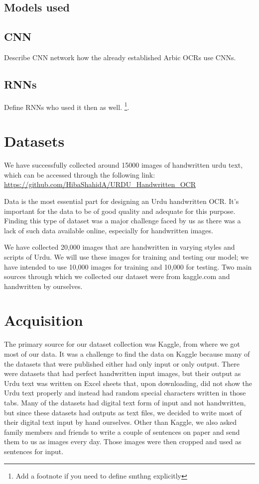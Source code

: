 \documentclass[9pt,twocolumn,twoside]{article} %
\begin{document}
\subsection{Models used}


\subsection{CNN}
Describe CNN network how the already established Arbic OCRs use CNNs.

\cite{rizvi2018ocr} %
\cite{mahdi2024ocr} %

\subsection{RNNs}
Define RNNs who used it \cite{rizvi2018ocr} then as well.
\footnote{ Add a footnote if you need to define smthng explicitly}.


\section{Datasets}
We have successfully collected around 15000 images of handwritten urdu text, which can be accessed through the following link:\\
\url{https://github.com/HibaShahidA/URDU_Handwritten_OCR}

Data is the most essential part for designing an Urdu handwritten OCR. It's important for the data to be of good quality and adequate for this purpose. Finding this type of dataset was a major challenge faced by us as there was a lack of such data available online, especially for handwritten images.

We have collected 20,000 images that are handwritten in varying styles and scripts of Urdu. We will use these images for training and testing our model; we have intended to use 10,000 images for training and 10,000 for testing. Two main sources through which we collected our dataset were from kaggle.com and handwritten by ourselves.

\section*{Acquisition}
The primary source for our dataset collection was Kaggle, from where we got most of our data. It was a challenge to find the data on Kaggle because many of the datasets that were published either had only input or only output. There were datasets that had perfect handwritten input images, but their output as Urdu text was written on Excel sheets that, upon downloading, did not show the Urdu text properly and instead had random special characters written in those tabs. Many of the datasets had digital text form of input and not handwritten, but since these datasets had outputs as text files, we decided to write most of their digital text input by hand ourselves. Other than Kaggle, we also asked family members and friends to write a couple of sentences on paper and send them to us as images every day. Those images were then cropped and used as sentences for input.
\end{document}
